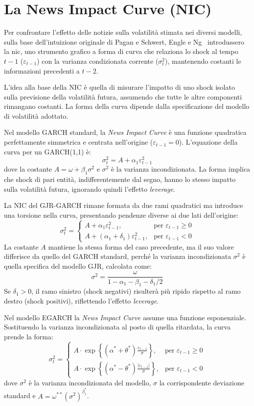 \section{La News Impact Curve (NIC)}
\label{sec:nic}
Per confrontare l'effetto delle notizie sulla volatilità stimata nei diversi modelli, sulla base dell'intuizione originale di Pagan e Schwert\cite{pagan:alternative}, 
Engle e Ng~\cite{engle:news} introdussero la \gls{nic}, uno strumento grafico a forma di curva che relaziona lo shock al tempo $t-1$ ($\varepsilon_{t-1}$) con la varianza 
condizionata corrente ($\sigma_t^2$), mantenendo costanti le informazioni precedenti a $t-2$. 

L'idea alla base della NIC è quella di misurare l'impatto di uno shock isolato sulla previsione della volatilità futura, assumendo che tutte le altre componenti 
rimangano costanti. La forma della curva dipende dalla specificazione del modello di volatilità adottato.

Nel modello GARCH standard, la \emph{News Impact Curve} è una funzione quadratica perfettamente simmetrica e centrata nell'origine ($\varepsilon_{t-1} = 0$). 
L'equazione della curva per un GARCH(1,1) è:
\[
    \sigma_t^2 = A + \alpha_1 \varepsilon_{t-1}^2
\]
dove la costante $A = \omega + \beta_1 \sigma^2$ e $\sigma^2$ è la varianza incondizionata. La forma implica che shock di pari entità, indifferentemente dal segno, 
hanno lo stesso impatto sulla volatilità futura, ignorando quindi l'effetto \emph{leverage}.

La NIC del GJR-GARCH rimane formata da due rami quadratici ma introduce una torsione nella curva, presentando pendenze diverse ai due lati dell'origine:
\[
    \sigma_t^2 = 
    \begin{cases} 
        A + \alpha_1 \varepsilon_{t-1}^2, & \text{per } \varepsilon_{t-1} \geq 0 \\
        A + (\alpha_1 + \delta_1) \varepsilon_{t-1}^2, & \text{per } \varepsilon_{t-1} < 0
    \end{cases}
\]
La costante $A$ mantiene la stessa forma del caso precedente, ma il suo valore differisce da quello del GARCH standard, perché la varianza incondizionata $\sigma^2$ è 
quella specifica del modello GJR, calcolata come:
\[
    \sigma^2 = \frac{\omega}{1-\alpha_1-\beta_1-\delta_1/2}
\]
Se $\delta_1 > 0$, il ramo sinistro (shock negativi) risulterà più ripido rispetto al ramo destro (shock positivi), riflettendo l'effetto \emph{leverage}.

Nel modello EGARCH la \emph{News Impact Curve} assume una funzione esponenziale. Sostituendo la varianza incondizionata al posto di quella ritardata, la curva prende la forma:
\[
    \sigma_t^2 = 
    \begin{cases} 
        A \cdot \exp\left\{ (\alpha^* + \theta^*) \frac{\varepsilon_{t-1}}{\sigma} \right\}, & \text{per } \varepsilon_{t-1} \geq 0 \\
        A \cdot \exp\left\{ (\alpha^* - \theta^*) \frac{|\varepsilon_{t-1}|}{\sigma} \right\}, & \text{per } \varepsilon_{t-1} < 0
    \end{cases}
\]
dove $\sigma^2$ è la varianza incondizionata del modello, $\sigma$ la corrispondente deviazione standard e $A = \omega^{**}(\sigma^2)^{\beta_1^*}$.

